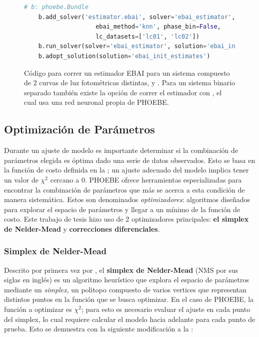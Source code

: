 \begin{figure}[!ht]
	\begin{lstlisting}[language=Python, autogobble]
	# b: phoebe.Bundle
	b.add_solver('estimator.ebai', solver='ebai_estimator', 
					ebai_method='knn', phase_bin=False, 
					lc_datasets=['lc01', 'lc02'])
	b.run_solver(solver='ebai_estimator', solution='ebai_init_estimates')
	b.adopt_solution(solution='ebai_init_estimates')
	\end{lstlisting}
	\caption{Código para correr un estimador EBAI para un sistema compuesto de 2
	curvas de luz fotométricas distintas,  y . Para un
	sistema binario separado también existe la opción de correr el estimador con
	, el cual usa una red neuronal propia de PHOEBE.}
\end{figure}

\subsection{Optimización de Parámetros}

Durante un ajuste de modelo es importante determinar si la combinación de
parámetros elegida es óptima dado una serie de datos observados. Esto se basa en
la función de costo definida en la ; un ajuste
adecuado del modelo implica tener un valor de $\chi^2$ cercano a 0. PHOEBE
ofrece herramientas especializadas para encontrar la combinación de parámetros
que más se acerca a esta condición de manera sistemática. Estos son denominados
\textit{optimizadores}: algoritmos diseñados para explorar el espacio de
parámetros y llegar a un mínimo de la función de costo. Este trabajo de tesis
hizo uso de 2 optimizadores principales: \textbf{el simplex de Nelder-Mead} y
\textbf{correcciones diferenciales}.

\subsubsection{Simplex de Nelder-Mead}

Descrito por primera vez por , el
\textbf{simplex de Nelder-Mead} (NMS por sus siglas en inglés) es un algoritmo
heurístico que explora el espacio de parámetros mediante un \textit{simplex}, un
politopo compuesto de varios vertices que representan distintos puntos en la
función que se busca optimizar. En el caso de PHOEBE, la función a optimizar es
$\chi^2$; para esto es necesario evaluar el ajuste en cada punto del simplex, lo
cual requiere calcular el modelo hacia adelante para cada punto de prueba. Esto
se demuestra con la siguiente modificación a la :

